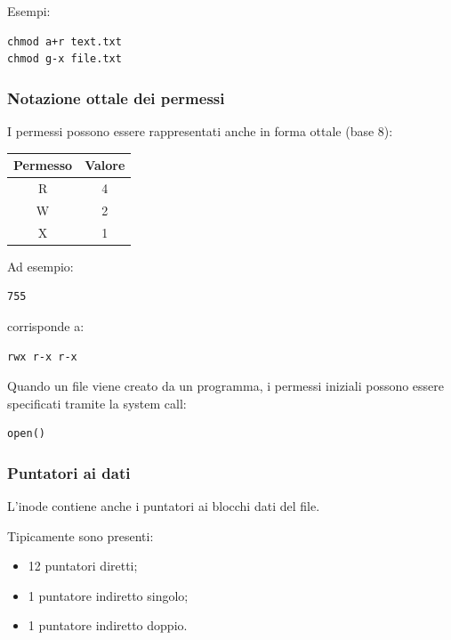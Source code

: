 \medskip

\noindent Esempi:

\begin{verbatim}
chmod a+r text.txt
chmod g-x file.txt
\end{verbatim}

\bigskip

\subsubsection*{Notazione ottale dei permessi}
I permessi possono essere rappresentati anche in forma ottale (base 8):

\begin{center}
\begin{tabular}{c|c}
Permesso & Valore \\ \hline
R & 4 \\
W & 2 \\
X & 1
\end{tabular}
\end{center}

\medskip

\noindent Ad esempio:

\begin{verbatim}
755
\end{verbatim}

\noindent
corrisponde a:

\begin{verbatim}
rwx r-x r-x
\end{verbatim}

\medskip

\noindent Quando un file viene creato da un programma, i permessi iniziali possono essere specificati tramite la system call:

\begin{verbatim}
open()
\end{verbatim}

\bigskip

\subsubsection*{Puntatori ai dati}
L’inode contiene anche i puntatori ai blocchi dati del file.

\noindent Tipicamente sono presenti:

\begin{itemize}
    \item 12 puntatori diretti;
    
    \item 1 puntatore indiretto singolo;
    
    \item 1 puntatore indiretto doppio.
\end{itemize}


